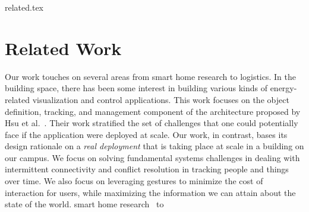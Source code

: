 related.tex

\section{Related Work}

Our work touches on several areas from smart home research to logistics.  In the building space, there has been
some interest in building various kinds of energy-related visualization and control applications.
This work focuses on the object definition, tracking, and management component of the architecture proposed by 
Hsu et al.~\cite{hbci}.  Their work stratified the set of challenges that one could potentially face if the application 
were deployed at scale.  Our
work, in contrast, bases its design rationale on a \emph{real deployment} that is taking place at scale in a building 
on our campus.  We focus on solving fundamental systems challenges in dealing with intermittent connectivity
and conflict resolution in tracking people and things over time.  We also focus on leveraging gestures to minimize
the cost of interaction for users, while maximizing the information we can attain about the state of the world.
smart home research~\cite{cooltown} to

